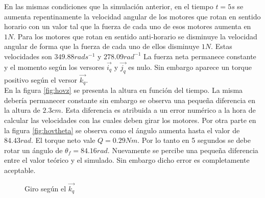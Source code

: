 \documentclass[main]{subfiles}
\begin{document}
En las mismas condiciones que la simulaci\'on anterior, en el tiempo $t=5s$ se aumenta repentinamente la velocidad angular de los motores que rotan en sentido horario con un valor tal que la fuerza de cada uno de esos motores aumenta en $1N$. Para los motores que rotan en sentido anti-horario se disminuye la velocidad angular de forma que la fuerza de cada uno de ellos disminuye $1N$. Estas velocidades son $349.88rads^{-1}$ y $278.09rad^{-1}$ La fuerza neta permanece constante y el momento seg\'un los versores $\vec{i_q}$ y $\vec{j_q} $ es nulo. Sin embargo aparece un torque positivo seg\'un el versor $\vec{k_q}$.\\

En la figura \ref{fig:hovz} se presenta la altura en funci\'on del tiempo. La misma deber\'ia permanecer constante sin embargo se observa una peque\~na diferencia en la altura de $2.3cm$. Esta diferencia es atribuida a un error num\'erico a la hora de calcular las velocidades con las cuales deben girar los motores. Por otra parte en la figura \ref{fig:hovtheta} se observa como el \'angulo aumenta hasta el valor de $84.43 rad$. El torque neto vale $Q = 0.29Nm $. Por lo tanto en 5 segundos se debe rotar un \'angulo de $\theta_f=84.16rad$. Nuevamente se percibe una peque\~na diferencia entre el valor te\'orico y el simulado. Sin embargo dicho error es completamente aceptable. 



\begin{figure} [h!]
  \centering
  \caption{Giro seg\'un el $\vec{k_q}$}
  \label{fig:hov}
\end{figure}
\end{document}
